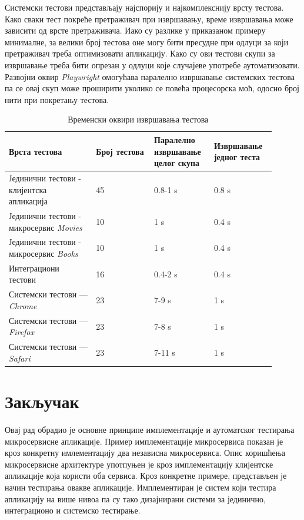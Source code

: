 \documentclass[12pt,oneside]{memoir}
\begin{document}
Системски тестови представљају најспорију и најкомплекснију врсту тестова. Како сваки тест покреће претраживач при извршавању, време извршавања може зависити од врсте претраживача. Иако су разлике у приказаном примеру минималне, за велики број тестова оне могу бити пресудне при одлуци за који претраживач треба оптимизовати апликацију. Како су ови тестови скупи за извршавање треба бити опрезан у одлуци које случајеве употребе аутоматизовати.
Развојни оквир \textit{Playwright} омогућава паралелно извршавање системских тестова па се овај скуп може проширити уколико се повећа процесорска моћ, одосно број нити при покретању тестова. 




\begin{table}
\label{tbl:vreme}
\caption{Временски оквири извршавања тестова}
\begin{tabular}{|p{0.3\linewidth} p{0.2\linewidth} p{0.2\linewidth} p{0.2\linewidth}|}
\hline
 \textbf{Врста тестова} & \textbf{Број тестова} &\textbf{Паралелно извршавање целог скупа} & \textbf{Извршавање једног теста} \\ [0.5ex] 
 \hline
 Јединични тестови - клијентска апликација & 45 & 0.8-1 s & 0.8 s\\ 
  \hline
 Јединични тестови - микросервис \textit{Movies} & 10 & 1 s & 0.4 s\\ 
  \hline
 Јединични тестови - микросервис \textit{Books} & 10 & 1 s & 0.4 s\\ 
 \hline
 Интеграциони тестови & 16 & 0.4-2 s & 0.4 s \\
 \hline
 Системски тестови --- \textit{Chrome} & 23 & 7-9 s & 1 s \\
  \hline
 Системски тестови  --- \textit{Firefox} & 23 & 7-8 s & 1 s \\
  \hline
 Системски тестови --- \textit{Safari} & 23 & 7-11 s & 1 s \\
 \hline
\end{tabular}
\end{table}

\chapter{Закључак}
\label{chp:zakljucak}

Овај рад обрадио је основне принципе имплементације и аутоматског тестирања микросервисне апликације. Пример имплементације микросервиса показан је кроз конкретну имлементацију два независна микросервиса. Опис коришћења микросервисне архитектуре употпуњен је кроз имплементацију клијентске апликације која користи оба сервиса. Кроз конкретне примере, представљен је начин тестирања овакве апликације. Имплементиран је систем који тестира апликацију на више нивоа па су тако дизајнирани системи за јединично, интеграционо и системско тестирање.
\end{document}
